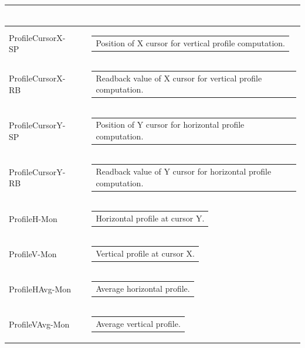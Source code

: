 \documentclass[openany]{article}
\begin{document}
\begin{longtable}{| m{3.0cm} m{4.5cm} m{7.0cm} |}
\begin{tabular}{@{}m{6cm}@{}}
            \end{tabular} \hypertarget{}{}\\ \hline
        ProfileCursorX-SP &  & \begin{tabular}{@{}m{6cm}@{}}
                Position of X cursor for vertical profile computation.
            \end{tabular} \\ \hline
        ProfileCursorX-RB &  & \begin{tabular}{@{}m{6cm}@{}}
                Readback value of X cursor for vertical profile computation.
            \end{tabular} \hypertarget{}{}\\ \hline
        ProfileCursorY-SP &  & \begin{tabular}{@{}m{6cm}@{}}
                Position of Y cursor for horizontal profile computation.
            \end{tabular} \\ \hline
        ProfileCursorY-RB &  & \begin{tabular}{@{}m{6cm}@{}}
                Readback value of Y cursor for horizontal profile computation.
            \end{tabular} \hypertarget{}{}\\ \hline
        ProfileH-Mon &  & \begin{tabular}{@{}m{6cm}@{}}
                Horizontal profile at cursor Y.
            \end{tabular} \hypertarget{}{}\\ \hline
        ProfileV-Mon &  & \begin{tabular}{@{}m{6cm}@{}}
                Vertical profile at cursor X.
            \end{tabular} \hypertarget{}{}\\ \hline
        ProfileHAvg-Mon &  & \begin{tabular}{@{}m{6cm}@{}}
                Average horizontal profile.
            \end{tabular} \hypertarget{}{}\\ \hline
        ProfileVAvg-Mon &  & \begin{tabular}{@{}m{6cm}@{}}
                Average vertical profile.
            \end{tabular} \hypertarget{}{}\\ \hline

\end{longtable}
\end{document}
